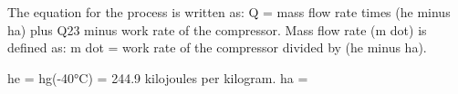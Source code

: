 The equation for the process is written as:  
Q = mass flow rate times (he minus ha) plus Q23 minus work rate of the compressor.  
Mass flow rate (m dot) is defined as:  
m dot = work rate of the compressor divided by (he minus ha).  

he = hg(-40°C) = 244.9 kilojoules per kilogram.  
ha =
